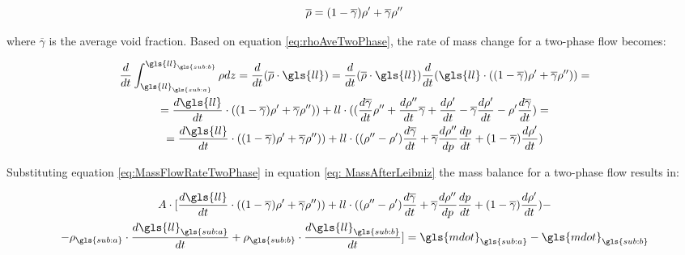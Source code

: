 \documentclass[11pt]{article} %
\begin{document}
\begin{equation}
\overline{\rho} = (1-\overline{\gamma}) \rho^\prime  + \overline{\gamma} \rho^{\prime\prime} 
\label{eq:rhoAveTwoPhase}
\end{equation}

where $ \overline{\gamma} $ is the average void fraction.
Based on equation \ref{eq:rhoAveTwoPhase}, the rate of mass change for a two-phase flow becomes:

\begin{gather}
 \frac{d}{dt} \int_{\gls{ll}_{\gls{sub:a}}}^{\gls{ll}_{\gls{sub:b}}} \rho  dz = \frac{d}{dt} ( \overline{\rho} \cdot \gls{ll}) = \frac{d}{dt} ( \overline{\rho} \cdot \gls{ll})  \frac{d}{dt} (\gls{ll}\cdot ((1-\overline{\gamma}) \rhop  + \overline{\gamma} \rhopp )) =  \\
= \frac{d\gls{ll}}{dt} \cdot ((1-\overline{\gamma}) \rhop  + \overline{\gamma} \rhopp )) + ll \cdot (( \frac{d \overline{\gamma}}{dt}\rhopp +  \frac{d \rhopp}{dt}  \overline{\gamma} + \frac{d \rhop}{dt} - \overline{\gamma} \frac{d \rhop}{dt} - \rhop \frac{d \overline{\gamma}}{dt}) = \\
= \frac{d\gls{ll}}{dt} \cdot ((1-\overline{\gamma}) \rhop  + \overline{\gamma} \rhopp )) + ll \cdot ((\rhopp - \rhop) \frac{d \overline{\gamma}}{dt} + \overline{\gamma} \frac{d \rhopp}{dp}\frac{d p}{dt} + (1-\overline{\gamma})\frac{d \rhop}{dt}) 
\label{eq:MassFlowRateTwoPhase}
\end{gather}

Substituting equation \ref{eq:MassFlowRateTwoPhase} in equation \ref{eq: MassAfterLeibniz} the mass balance for a two-phase flow results in:

\begin{gather}
A \cdot [ \frac{d\gls{ll}}{dt} \cdot ((1-\overline{\gamma}) \rhop  + \overline{\gamma} \rhopp )) + ll \cdot ((\rhopp - \rhop)\frac{d \overline{\gamma}}{dt} + \overline{\gamma} \frac{d \rhopp}{dp}\frac{d p}{dt} + (1-\overline{\gamma})\frac{d \rhop}{dt}) - \\
- \rho_{\gls{sub:a}}\cdot \frac{d\gls{ll}_{\gls{sub:a}}}{dt} + \rho_{\gls{sub:b}} \cdot \frac{d\gls{ll}_{\gls{sub:b}}}{dt} ] =  \gls{mdot}_{\gls{sub:a}} - \gls{mdot}_{\gls{sub:b}}
\label{eq: MassBalanceTwoPhase}
\end{gather}
\end{document}
